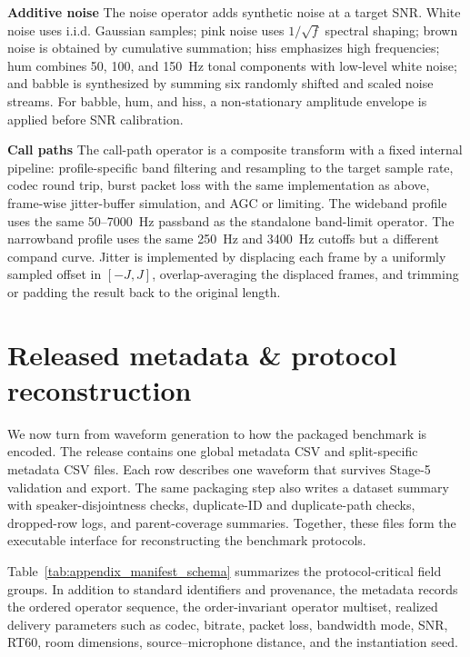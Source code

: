 \noindent\textbf{Additive noise} The noise operator adds synthetic noise at a target SNR. White noise uses i.i.d. Gaussian samples; pink noise uses $1/\sqrt{f}$ spectral shaping; brown noise is obtained by cumulative summation; hiss emphasizes high frequencies; hum combines 50, 100, and 150~Hz tonal components with low-level white noise; and babble is synthesized by summing six randomly shifted and scaled noise streams. For babble, hum, and hiss, a non-stationary amplitude envelope is applied before SNR calibration.

\noindent\textbf{Call paths} The call-path operator is a composite transform with a fixed internal pipeline: profile-specific band filtering and resampling to the target sample rate, codec round trip, burst packet loss with the same implementation as above, frame-wise jitter-buffer simulation, and AGC or limiting. The wideband profile uses the same 50--7000~Hz passband as the standalone band-limit operator. The narrowband profile uses the same 250~Hz and 3400~Hz cutoffs but a different compand curve. Jitter is implemented by displacing each frame by a uniformly sampled offset in $[-J, J]$, overlap-averaging the displaced frames, and trimming or padding the result back to the original length.

\section{Released metadata \& protocol reconstruction}
\label{app:release_metadata}

We now turn from waveform generation to how the packaged benchmark is encoded. The release contains one global metadata CSV and split-specific metadata CSV files. Each row describes one waveform that survives Stage-5 validation and export. The same packaging step also writes a dataset summary with speaker-disjointness checks, duplicate-ID and duplicate-path checks, dropped-row logs, and parent-coverage summaries. Together, these files form the executable interface for reconstructing the benchmark protocols.

Table~\ref{tab:appendix_manifest_schema} summarizes the protocol-critical field groups. In addition to standard identifiers and provenance, the metadata records the ordered operator sequence, the order-invariant operator multiset, realized delivery parameters such as codec, bitrate, packet loss, bandwidth mode, SNR, RT60, room dimensions, source--microphone distance, and the instantiation seed.

